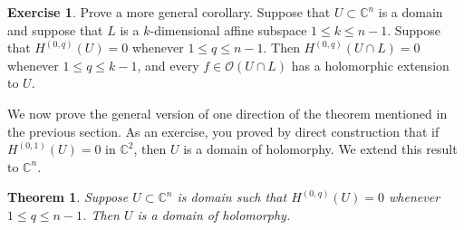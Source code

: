 \documentclass[12pt,openany]{book}
\newcommand{\C}{{\mathbb{C}}}
\newcommand{\sO}{{\mathscr{O}}}
\theoremstyle{plain}
\newtheorem{thm}{Theorem}[section]
\theoremstyle{remark}
\theoremstyle{definition}
\newenvironment{exbox}{%
    \def\FrameCommand{\vrule width 1pt \relax\hspace{10pt}}%
    \MakeFramed{\advance\hsize-\width\FrameRestore}%
}{%
    \endMakeFramed
}
\theoremstyle{exercise}
\newtheorem{exercise}{Exercise}[section]
\theoremstyle{example}
\begin{document}
\begin{exbox}
\begin{exercise}
Prove a more general corollary.
Suppose that $U \subset \C^n$ is a domain and suppose that
$L$ is a $k$-dimensional affine subspace $1 \leq k \leq n-1$.
Suppose that $H^{(0,q)}(U) = 0$ whenever $1 \leq q \leq n-1$.  Then
$H^{(0,q)}(U \cap L) = 0$ whenever $1 \leq q \leq k-1$,
and every $f \in \sO(U \cap L)$ has a holomorphic extension to $U$.
\end{exercise}
\end{exbox}

We now prove the general version of one direction of the theorem mentioned
in the previous section.  As an exercise, you proved by direct
construction that if $H^{(0,1)}(U) = 0$ in $\C^2$, then $U$ is a domain of
holomorphy.  We extend this result to $\C^n$.

\begin{thm} \label{thm:dolhomimpliesdoh}
Suppose $U \subset \C^n$ is domain such that $H^{(0,q)}(U) = 0$
whenever $1 \leq q \leq n-1$.  Then $U$ is a domain of holomorphy.
\end{thm}
\end{document}
